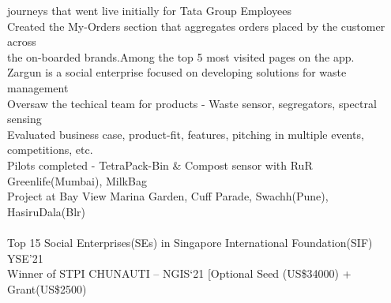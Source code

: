 \documentclass[]{deedy-resume-openfont}
\begin{document}
\begin{minipage}[t]{0.66\textwidth}
{\hspace{5mm} journeys that went live initially for Tata Group Employees\\
\hspace{2mm} \textbullet{} Created the My-Orders section that aggregates orders placed by the customer across\\
\hspace{5mm} the on-boarded brands.Among the top 5 most visited pages on the app.\\
}
\sectionsep
\vspace{0.5mm}
\vspace{1.5mm}
\small {
\hspace{2mm} \textbullet{} Zargun is a social enterprise focused on developing solutions for waste management\\
\hspace{2mm} \textbullet{} Oversaw the techical team for products - Waste sensor, segregators, spectral sensing\\
\hspace{2mm} \textbullet{} Evaluated business case, product-fit, features, pitching in multiple events, competitions, etc.\\
\hspace{2mm} \textbullet{} Pilots completed - TetraPack-Bin \& Compost sensor with RuR Greenlife(Mumbai), MilkBag\\
\hspace{4.5mm} Project at Bay View Marina Garden, Cuff Parade, Swachh(Pune), HasiruDala(Blr) \\
\vspace{1mm}
\\
\hspace{2mm} \textbullet{} Top 15 Social Enterprises(SEs) in Singapore International Foundation(SIF) YSE'21\\
\hspace{2mm} \textbullet{} Winner of STPI CHUNAUTI – NGIS‘21 [Optional Seed (US\$34000) + Grant(US\$2500)\\
}
\end{minipage}
\end{document}

